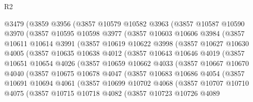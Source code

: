 \begin{lexlean}{R2}
\begin{coremodule}
    @3479
      (@3859
        @3956
        (@3857
          @10579
          @10582
          @3963
          (@3857
            @10587
            @10590
            @3970
            (@3857
              @10595
              @10598
              @3977
              (@3857
                @10603
                @10606
                @3984
                (@3857
                  @10611
                  @10614
                  @3991
                  (@3857
                    @10619
                    @10622
                    @3998
                    (@3857
                      @10627
                      @10630
                      @4005
                      (@3857
                        @10635
                        @10638
                        @4012
                        (@3857
                          @10643
                          @10646
                          @4019
                          (@3857
                            @10651
                            @10654
                            @4026
                            (@3857
                              @10659
                              @10662
                              @4033
                              (@3857
                                @10667
                                @10670
                                @4040
                                (@3857
                                  @10675
                                  @10678
                                  @4047
                                  (@3857
                                    @10683
                                    @10686
                                    @4054
                                    (@3857
                                      @10691
                                      @10694
                                      @4061
                                      (@3857
                                        @10699
                                        @10702
                                        @4068
                                        (@3857
                                          @10707
                                          @10710
                                          @4075
                                          (@3857
                                            @10715
                                            @10718
                                            @4082
                                            (@3857
                                              @10723
                                              @10726
                                              @4089

\end{coremodule}
\end{lexlean}
